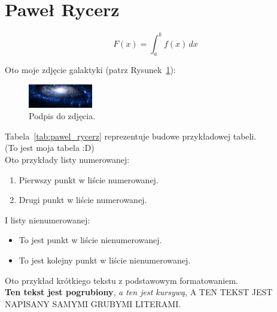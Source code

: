 \documentclass[a4paper]{article}
\begin{document}
\section{Paweł Rycerz}
\label{sec:prycerz}



\[
F(x) = \int_{a}^{b} f(x) \, dx
\]


Oto moje zdjęcie galaktyki (patrz Rysunek~\ref{fig:galaktyka}):
\begin{figure}[h]
    \centering
    \includegraphics[width=0.25\textwidth]{pictures/galaktyka.png}
    \caption{Podpis do zdjęcia.}
    \label{fig:galaktyka}
\end{figure}


Tabela~\ref{tab:pawel_rycerz} reprezentuje budowe przykładowej tabeli.\\
(To jest moja tabela :D) \\



Oto przykłady listy numerowanej:

\begin{enumerate}
    \item Pierwszy punkt w liście numerowanej.
    \item Drugi punkt w liście numerowanej.
\end{enumerate}

I listy nienumerowanej:

\begin{itemize}
    \item To jest punkt w liście nienumerowanej.
    \item To jest kolejny punkt w liście nienumerowanej.
\end{itemize}


Oto przykład krótkiego tekstu z podstawowym formatowaniem.\\ \textbf{Ten tekst jest pogrubiony}, \emph{a ten jest kursywą}, \MakeUppercase{a ten tekst jest napisany samymi grubymi literami.}\\
\end{document}
